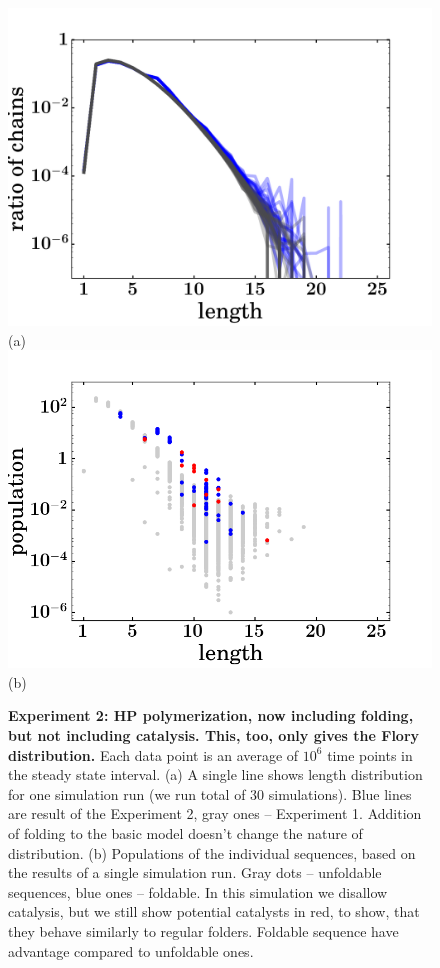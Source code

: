 \documentclass[journal=jacsat,manuscript=article,layout=twocolumn]{achemso}
\begin{document}
\begin{figure}[hbt!]
  \centering
  \includegraphics[width=0.9\columnwidth]{pictures/distr-folded-many.pdf} (a)
   \includegraphics[width=0.9\columnwidth]{pictures/scatter209.png}(b)
  \caption{\footnotesize{\textbf{Experiment 2: HP polymerization, now including folding, but not 
including catalysis.  This, too, only gives the Flory distribution.}  Each data point is an average 
of $10^6$ time points in the steady state interval. (a) 
A single line shows length distribution for one simulation run (we run total of 30 simulations). 
Blue lines are result of the Experiment 2, gray ones -- Experiment 1. Addition of folding to the 
basic model doesn't change the nature of distribution. (b) Populations of the individual sequences, 
based on the results of a single simulation run. Gray dots -- unfoldable sequences, blue ones -- 
foldable. In this simulation we disallow catalysis, but we still show potential catalysts in red, 
to show, that they behave similarly to regular folders. Foldable sequence have advantage compared to unfoldable ones.}}
  \label{fig:sim.flory-fold}
\end{figure}
\end{document}
